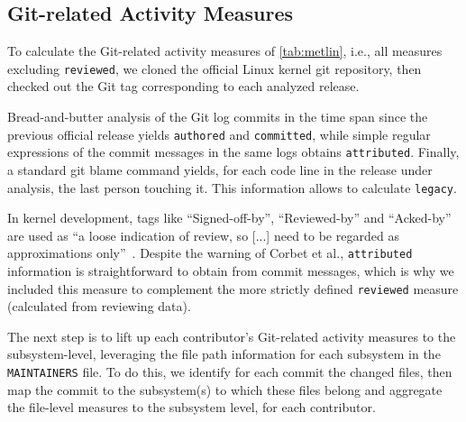 \subsection{Git-related Activity Measures}
\label{sec:git-relat-activ}

To calculate the Git-related activity measures of \autoref{tab:metlin}, i.e., all measures excluding \texttt{reviewed}, we cloned the official Linux kernel git repository, then checked out the Git tag corresponding to each analyzed release.

Bread-and-butter analysis of the Git log commits in the time span since the previous official release yields \texttt{authored} and \texttt{committed}, while simple regular expressions of the commit messages in the same logs obtains \texttt{attributed}. Finally, a standard git blame command yields, for each code line in the release under analysis, the last person touching it. This information allows to calculate \texttt{legacy}.

In kernel development, tags like ``Signed-off-by'', ``Reviewed-by'' and ``Acked-by'' are used as ``a loose indication of review, so [...] need to be regarded as approximations only''~\citep{corbet17}. Despite the warning of Corbet et al., \texttt{attributed} information is straightforward to obtain from commit messages, which is why we included this measure to complement the more strictly defined \texttt{reviewed} measure (calculated from reviewing data).

The next step is to lift up each contributor's Git-related activity measures to the subsystem-level, leveraging the file path information for each subsystem in the \texttt{MAINTAINERS} file. To do this, we identify for each commit the changed files, then map the commit to the subsystem(s) to which these files belong and aggregate the file-level measures to the subsystem level, for each contributor.%




